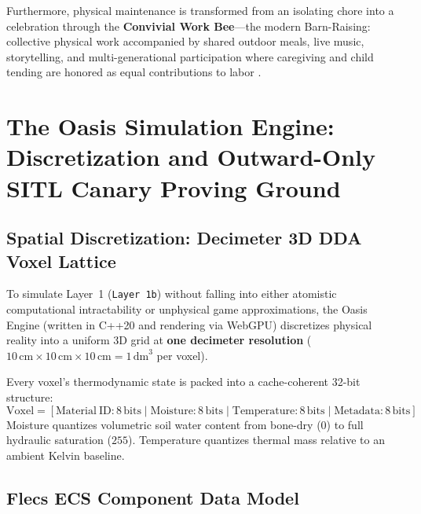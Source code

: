 Furthermore, physical maintenance is transformed from an isolating chore into a celebration through the \textbf{Convivial Work Bee}---the modern Barn-Raising: collective physical work accompanied by shared outdoor meals, live music, storytelling, and multi-generational participation where caregiving and child tending are honored as equal contributions to labor \parencite{ostrom1990}.

\section{The Oasis Simulation Engine: Discretization and Outward-Only SITL Canary Proving Ground}
\label{sec:l1_oasis}

\subsection{Spatial Discretization: Decimeter 3D DDA Voxel Lattice}

To simulate Layer~1 (\texttt{Layer 1b}) without falling into either atomistic computational intractability or unphysical game approximations, the Oasis Engine (written in C++20 and rendering via WebGPU) discretizes physical reality into a uniform 3D grid at \textbf{one decimeter resolution} ($10\,\mathrm{cm} \times 10\,\mathrm{cm} \times 10\,\mathrm{cm} = 1\,\mathrm{dm}^3$ per voxel).

Every voxel's thermodynamic state is packed into a cache-coherent 32-bit structure:
\begin{equation}
\mathrm{Voxel} = [\mathrm{Material~ID}: 8\,\mathrm{bits} \mid \mathrm{Moisture}: 8\,\mathrm{bits} \mid \mathrm{Temperature}: 8\,\mathrm{bits} \mid \mathrm{Metadata}: 8\,\mathrm{bits}]
\label{eq:voxel_packing}
\end{equation}
Moisture quantizes volumetric soil water content from bone-dry ($0$) to full hydraulic saturation ($255$). Temperature quantizes thermal mass relative to an ambient Kelvin baseline.

\subsection{Flecs ECS Component Data Model}

